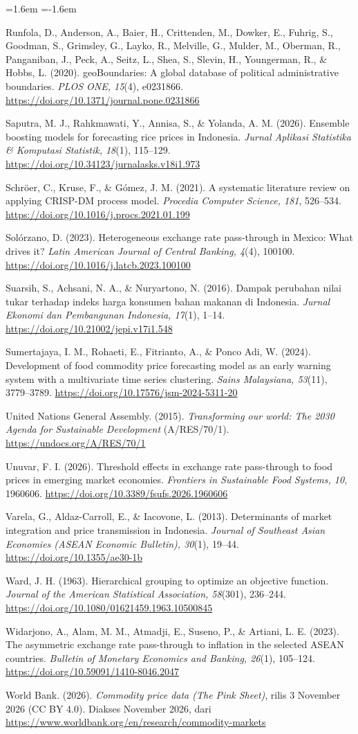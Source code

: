 \documentclass[11pt,a4paper]{article}
\newcommand{\refitem}[1]{\item\label{ref:#1}}
\begin{document}
\begin{list}{}{\leftmargin=1.6em \itemindent=-1.6em \itemsep=1.5pt \parsep=0pt \topsep=2pt}
\refitem{runfola2020} Runfola, D., Anderson, A., Baier, H., Crittenden, M., Dowker, E., Fuhrig, S., Goodman, S., Grimsley, G.,
Layko, R., Melville, G., Mulder, M., Oberman, R., Panganiban, J., Peck, A., Seitz, L., Shea, S., Slevin, H., Youngerman, R., \&
Hobbs, L. (2020). geoBoundaries: A global database of political administrative boundaries. \textit{PLOS ONE, 15}(4), e0231866.
\url{https://doi.org/10.1371/journal.pone.0231866}
\refitem{saputra2026} Saputra, M. J., Rahkmawati, Y., Annisa, S., \& Yolanda, A. M. (2026). Ensemble boosting models for forecasting
rice prices in Indonesia. \textit{Jurnal Aplikasi Statistika \& Komputasi Statistik, 18}(1), 115–129.
\url{https://doi.org/10.34123/jurnalasks.v18i1.973}
\refitem{schroer2021} Schröer, C., Kruse, F., \& Gómez, J. M. (2021). A systematic literature review on applying CRISP-DM process
model. \textit{Procedia Computer Science, 181}, 526–534. \url{https://doi.org/10.1016/j.procs.2021.01.199}
\refitem{solorzano2023} Solórzano, D. (2023). Heterogeneous exchange rate pass-through in Mexico: What drives it? \textit{Latin
American Journal of Central Banking, 4}(4), 100100. \url{https://doi.org/10.1016/j.latcb.2023.100100}
\refitem{suarsih2016} Suarsih, S., Achsani, N. A., \& Nuryartono, N. (2016). Dampak perubahan nilai tukar terhadap indeks harga
konsumen bahan makanan di Indonesia. \textit{Jurnal Ekonomi dan Pembangunan Indonesia, 17}(1), 1–14.
\url{https://doi.org/10.21002/jepi.v17i1.548}
\refitem{sumertajaya2024} Sumertajaya, I. M., Rohaeti, E., Fitrianto, A., \& Ponco Adi, W. (2024). Development of food commodity
price forecasting model as an early warning system with a multivariate time series clustering. \textit{Sains Malaysiana, 53}(11),
3779–3789. \url{https://doi.org/10.17576/jsm-2024-5311-20}
\refitem{un2015} United Nations General Assembly. (2015). \textit{Transforming our world: The 2030 Agenda for Sustainable Development}
(A/RES/70/1). \url{https://undocs.org/A/RES/70/1}
\refitem{unuvar2026} Unuvar, F. I. (2026). Threshold effects in exchange rate pass-through to food prices in emerging market
economies. \textit{Frontiers in Sustainable Food Systems, 10}, 1960606. \url{https://doi.org/10.3389/fsufs.2026.1960606}
\refitem{varela2013} Varela, G., Aldaz-Carroll, E., \& Iacovone, L. (2013). Determinants of market integration and price transmission
in Indonesia. \textit{Journal of Southeast Asian Economies (ASEAN Economic Bulletin), 30}(1), 19–44. \url{https://doi.org/10.1355/ae30-1b}
\refitem{ward1963} Ward, J. H. (1963). Hierarchical grouping to optimize an objective function. \textit{Journal of the American
Statistical Association, 58}(301), 236–244. \url{https://doi.org/10.1080/01621459.1963.10500845}
\refitem{widarjono2023} Widarjono, A., Alam, M. M., Atmadji, E., Suseno, P., \& Artiani, L. E. (2023). The asymmetric exchange rate
pass-through to inflation in the selected ASEAN countries. \textit{Bulletin of Monetary Economics and Banking, 26}(1), 105–124.
\url{https://doi.org/10.59091/1410-8046.2047}
\refitem{worldbank2026} World Bank. (2026). \textit{Commodity price data (The Pink Sheet)}, rilis 3 November 2026 (CC BY 4.0). Diakses
November 2026, dari \url{https://www.worldbank.org/en/research/commodity-markets}
\end{list}
\endgroup
\end{document}
